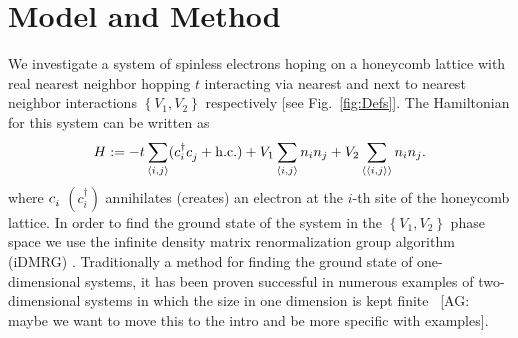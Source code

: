 \documentclass[aps,prx,10pt,twocolumn,floatfix,superscriptaddress,showpacs,numerical,footinbib]{revtex4-1}
\newcommand{\noteAG}[1]{{\color{blue} [AG: #1]}}
\newcommand{\bs}[1]{{\boldsymbol{#1}}}
\begin{document}
\section{\label{sec:modandmeth}Model and Method}
%
We investigate a system of spinless electrons hoping on a honeycomb lattice with real nearest neighbor hopping $t$ interacting via nearest and next to nearest neighbor interactions 
$\left\lbrace V_{1},V_{2}\right\rbrace$ respectively [see Fig.~\ref{fig:Defs}]. 
%
The Hamiltonian for this system can be written as
\begin{equation}
%
 H:=-t\sum_{\left\langle i,j\right\rangle}(c^{\dagger}_{i}c^{\vphantom{\dagger}}_{j}+ \mathrm{h.c.})+
V_{1}\sum_{\left\langle i,j\right\rangle }n_{i}n_{j}+
%
V_{2}\sum_{\left\langle \left\langle i,j\right\rangle \right\rangle }n_{i}n_{j}.
%
\label{eq:H}
\end{equation}
%
where $c_{i}^{\vphantom{\dagger}}$ $(c^{\dagger}_{i})$  annihilates (creates) an electron at the $i$-th site of the honeycomb lattice.
%
%
In order to find the ground state of the system in the $\left\lbrace V_{1},V_{2}\right\rbrace$ phase space
we use the infinite density matrix renormalization group algorithm (iDMRG) \cite{M08,W92,KZM13}.
%
Traditionally a method for finding the ground state of one-dimensional systems, it has been proven successful in numerous examples of two-dimensional systems in which the size in one dimension is kept finite~\cite{papers}\noteAG{maybe we want to move this to the intro and be more specific with examples}. 
\end{document}
